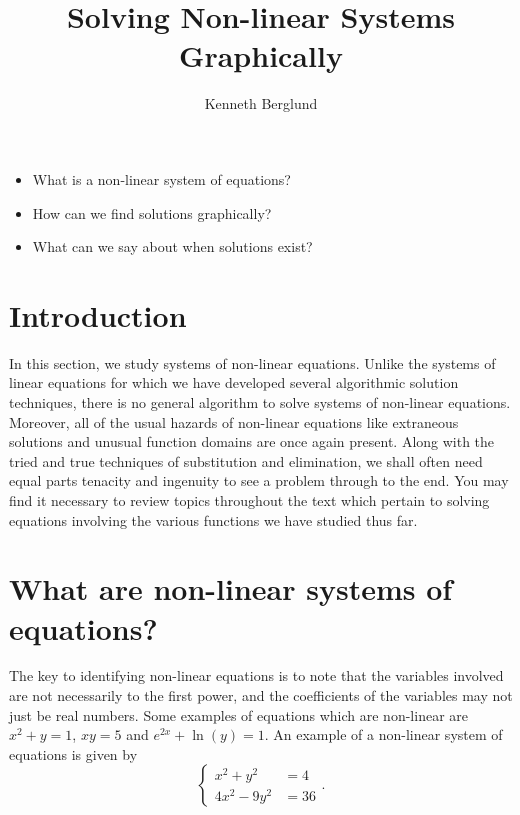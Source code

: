 \documentclass[nooutcomes]{ximera}
\author{Kenneth Berglund}
\title{Solving Non-linear Systems Graphically}
\begin{document}
\begin{abstract}
  
\end{abstract}
\licenseSZ
\maketitle

\begin{motivatingQuestions}\begin{itemize}
	\item What is a non-linear system of equations?
	\item How can we find solutions graphically?
	\item What can we say about when solutions exist?
\end{itemize}\end{motivatingQuestions}

\section{Introduction}
In this section, we study systems of non-linear equations. Unlike the systems of linear equations for which we have developed several algorithmic solution techniques, there is no general algorithm to solve systems of non-linear equations. Moreover, all of the usual hazards of non-linear equations like extraneous solutions and unusual function domains are once again present. Along with the tried and true techniques of substitution and elimination, we shall often need equal parts tenacity and ingenuity to see a problem through to the end. You may find it necessary to review topics throughout the text which pertain to solving equations involving the various functions we have studied thus far. 




\section{What are non-linear systems of equations?}

The key to identifying non-linear equations is to note that the variables involved are not necessarily to the first power, and the coefficients of the variables may not just be real numbers. Some examples of equations which are non-linear are $x^2+y = 1$, $xy = 5$ and $e^{2x} + \ln(y) = 1$. An example of a non-linear system of equations is given by 
$$
\begin{cases}
x^2 + y^2 & =  4 \\
4x^2 - 9y^2 & = 36
\end{cases}.
$$	
\end{document}
